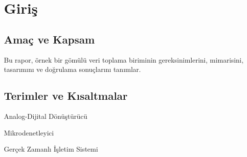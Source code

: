 \section{Giriş}
\label{sec:giris}

\subsection{Amaç ve Kapsam}
Bu rapor, örnek bir gömülü veri toplama biriminin gereksinimlerini,
mimarisini, tasarımını ve doğrulama sonuçlarını tanımlar.

\subsection{Terimler ve Kısaltmalar}
\begin{description}[style=nextline,leftmargin=2.5cm]
  \item[ADC] Analog-Dijital Dönüştürücü
  \item[MCU] Mikrodenetleyici
  \item[RTOS] Gerçek Zamanlı İşletim Sistemi
\end{description}
